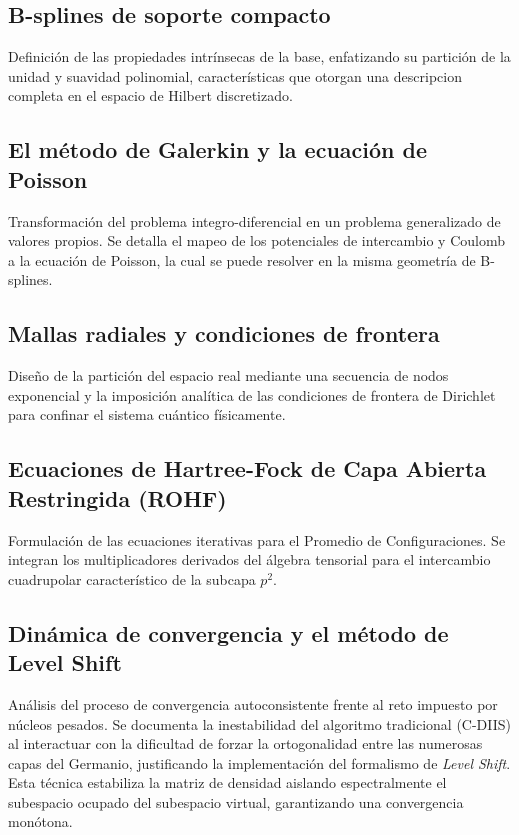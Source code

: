\documentclass[12pt,a4paper]{book}
\begin{document}
\subsection{B-splines de soporte compacto}
Definición de las propiedades intrínsecas de la base, enfatizando su partición de la unidad y suavidad polinomial, características que otorgan una descripcion completa en el espacio de Hilbert discretizado.

\subsection{El método de Galerkin y la ecuación de Poisson}
Transformación del problema integro-diferencial en un problema generalizado de valores propios. Se detalla el mapeo de los potenciales de intercambio y Coulomb a la ecuación de Poisson, la cual se puede resolver en la misma geometría de B-splines.

\subsection{Mallas radiales y condiciones de frontera}
Diseño de la partición del espacio real mediante una secuencia de nodos exponencial y la imposición analítica de las condiciones de frontera de Dirichlet para confinar el sistema cuántico físicamente.

\subsection{Ecuaciones de Hartree-Fock de Capa Abierta Restringida (ROHF)}
Formulación de las ecuaciones iterativas para el Promedio de Configuraciones. Se integran los multiplicadores derivados del álgebra tensorial para el intercambio cuadrupolar característico de la subcapa $p^2$.

\subsection{Dinámica de convergencia y el método de Level Shift}
Análisis del proceso de convergencia autoconsistente frente al reto impuesto por núcleos pesados. Se documenta la inestabilidad del algoritmo tradicional (C-DIIS) al interactuar con la dificultad de forzar la ortogonalidad entre las numerosas capas del Germanio, justificando la implementación del formalismo de \textit{Level Shift}. Esta técnica estabiliza la matriz de densidad aislando espectralmente el subespacio ocupado del subespacio virtual, garantizando una convergencia monótona.
\end{document}
